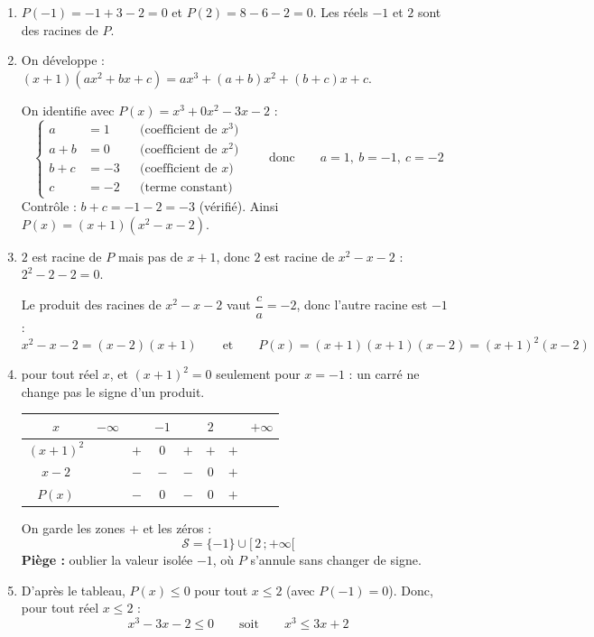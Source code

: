 \begin{enumerate}[itemsep=14pt]
  \item $P(-1)=-1+3-2=0$ \quad et \quad $P(2)=8-6-2=0$. Les réels $-1$ et $2$ sont des racines de $P$.

  \item On développe : $(x+1)(ax^2+bx+c)=ax^3+(a+b)x^2+(b+c)x+c$.

  On identifie avec $P(x)=x^3+0x^2-3x-2$ :
  \[
  \left\{
  \begin{aligned}
    a&=1 &&\text{(coefficient de }x^3\text{)}\\
    a+b&=0 &&\text{(coefficient de }x^2\text{)}\\
    b+c&=-3 &&\text{(coefficient de }x\text{)}\\
    c&=-2 &&\text{(terme constant)}
  \end{aligned}
  \right.
  \qquad\text{donc}\qquad a=1,\ b=-1,\ c=-2
  \]
  Contrôle : $b+c=-1-2=-3$ (vérifié). \quad Ainsi $P(x)=(x+1)(x^2-x-2)$.

  \item $2$ est racine de $P$ mais pas de $x+1$, donc $2$ est racine de $x^2-x-2$ : $2^2-2-2=0$.

  Le produit des racines de $x^2-x-2$ vaut $\dfrac ca=-2$, donc l'autre racine est $-1$ :
  \[x^2-x-2=(x-2)(x+1)\qquad\text{et}\qquad P(x)=(x+1)(x+1)(x-2)=(x+1)^2(x-2)\]

  \item
  \begin{prop}
   pour tout réel $x$, et $(x+1)^2=0$ seulement pour $x=-1$ : un carré ne change pas le signe d'un produit.
  \end{prop}
  \begin{center}
  
  \begin{tabular}{c|ccccccc}
    $x$ & $-\infty$ & & $-1$ & & $2$ & & $+\infty$ \\ \hline
    $(x+1)^2$ & & $+$ & $0$ & $+$ & $+$ & $+$ & \\
    $x-2$ & & $-$ & $-$ & $-$ & $0$ & $+$ & \\ \hline
    $P(x)$ & & $-$ & $0$ & $-$ & $0$ & $+$ &
  \end{tabular}
  \end{center}
  On garde les zones $+$ et les zéros :
  \[\mathcal S=\{-1\}\cup[\,2\,;+\infty[\]
  \textbf{Piège :} oublier la valeur isolée $-1$, où $P$ s'annule sans changer de signe.

  \item D'après le tableau, $P(x)\leq0$ pour tout $x\leq2$ (avec $P(-1)=0$). Donc, pour tout réel $x\leq2$ :
  \[x^3-3x-2\leq0\qquad\text{soit}\qquad x^3\leq3x+2\]
\end{enumerate}
